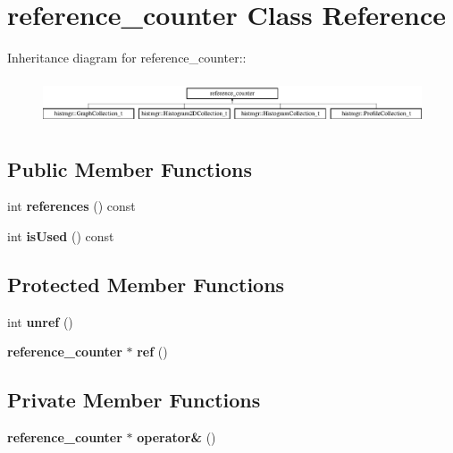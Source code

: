 \section{reference\_\-counter Class Reference}
\label{classreference__counter}
Inheritance diagram for reference\_\-counter::\begin{figure}[H]
\begin{center}
\leavevmode
\includegraphics[height=1.37255cm]{classreference__counter}
\end{center}
\end{figure}
\subsection*{Public Member Functions}
\begin{DoxyCompactItemize}
\item 
int {\bfseries references} () const \label{classreference__counter_ac1da688951ae1a15d2b38fba6be3578e}

\item 
int {\bfseries isUsed} () const \label{classreference__counter_a150263255106bfe81c6ef086098b16bd}

\end{DoxyCompactItemize}
\subsection*{Protected Member Functions}
\begin{DoxyCompactItemize}
\item 
int {\bfseries unref} ()\label{classreference__counter_a2d715904d0723dc6daef682c98793667}

\item 
{\bf reference\_\-counter} $\ast$ {\bfseries ref} ()\label{classreference__counter_a74ffff2ab271730a149d5337db9b347d}

\end{DoxyCompactItemize}
\subsection*{Private Member Functions}
\begin{DoxyCompactItemize}
\item 
{\bf reference\_\-counter} $\ast$ {\bfseries operator\&} ()\label{classreference__counter_a8f6c78124ca5d3d6d7fd2cef42c5ad1f}

\end{DoxyCompactItemize}

